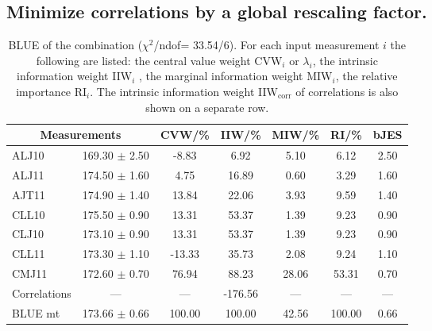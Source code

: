 \subsection{Minimize correlations by a global rescaling factor.}
\begin{table}[H]
\scriptsize
\begin{center}
\renewcommand{\arraystretch}{1.1}
\begin{tabular}{|lc|c|c|c|c|c|}
\hline
\multicolumn{2}{|c|}{Measurements} & CVW/\%  & IIW/\%  & MIW/\%  & RI/\%  & {\tiny bJES}\\
\hline
ALJ10 &     169.30 $\pm$       2.50 &      -8.83 &       6.92 &       5.10 &       6.12 &       2.50\\
ALJ11 &     174.50 $\pm$       1.60 &       4.75 &      16.89 &       0.60 &       3.29 &       1.60\\
AJT11 &     174.90 $\pm$       1.40 &      13.84 &      22.06 &       3.93 &       9.59 &       1.40\\
CLL10 &     175.50 $\pm$       0.90 &      13.31 &      53.37 &       1.39 &       9.23 &       0.90\\
CLJ10 &     173.10 $\pm$       0.90 &      13.31 &      53.37 &       1.39 &       9.23 &       0.90\\
CLL11 &     173.30 $\pm$       1.10 &     -13.33 &      35.73 &       2.08 &       9.24 &       1.10\\
CMJ11 &     172.60 $\pm$       0.70 &      76.94 &      88.23 &      28.06 &      53.31 &       0.70\\
Correlations & --- & --- &    -176.56 & --- & --- & ---\\
\hline
BLUE {\tiny mt} &     173.66 $\pm$       0.66 &     100.00 &     100.00 &      42.56 &     100.00 &       0.66\\
\hline
\end{tabular}
\caption{BLUE of the combination ($\chi^2$/ndof=     33.54/6).
 For each input measurement $i$ the following are listed: the central value weight CVW$_i$ or $\lambda_i$, the intrinsic information weight IIW$_i$ , the marginal information weight MIW$_i$, the relative importance RI$_i$. The intrinsic information weight IIW$_{\mathrm{corr}}$ of correlations is also shown on a separate row.}
\renewcommand{\arraystretch}{1}
\end{center}
\end{table}

